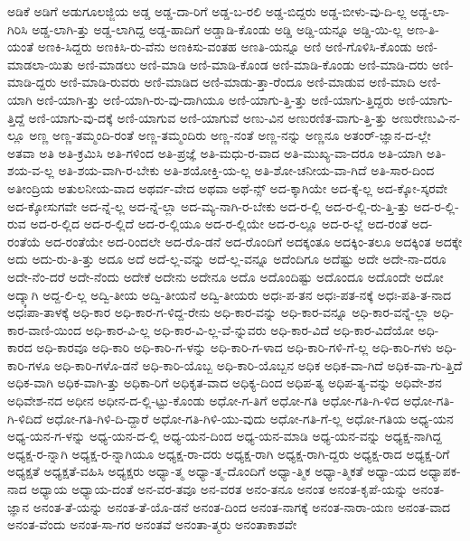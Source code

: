 {ಅಡಿಕೆ
ಅಡಿಗೆ
ಅಡುಗೂಲಜ್ಜಿಯ
ಅಡ್ಡ
ಅಡ್ಡ-ದಾ-ರಿಗೆ
ಅಡ್ಡ-ಬ-ರಲಿ
ಅಡ್ಡ-ಬಿದ್ದರು
ಅಡ್ಡ-ಬೀಳು-ವು-ದಿ-ಲ್ಲ
ಅಡ್ಡ-ಲಾ-ಗಿರಿಸಿ
ಅಡ್ಡ-ಲಾಗಿ-ತ್ತು
ಅಡ್ಡ-ಲಾಗಿದ್ದ
ಅಡ್ಡ-ಹಾದಿಗೆ
ಅಡ್ಡಾಡಿ-ಕೊಂಡು
ಅಡ್ಡಿ
ಅಡ್ಡಿ-ಯನ್ನೂ
ಅಡ್ಡಿ-ಯಿ-ಲ್ಲ
ಅಣ-ತಿ-ಯಂತೆ
ಅಣಕಿ-ಸಿದ್ದರು
ಅಣಕಿಸಿ-ರು-ವೆನು
ಅಣಕಿಸು-ವಂತಹ
ಅಣತಿ-ಯನ್ನೂ
ಅಣಿ
ಅಣಿ-ಗೊಳಿಸಿ-ಕೊಂಡು
ಅಣಿ-ಮಾಡಲಾ-ಯಿತು
ಅಣಿ-ಮಾಡಲು
ಅಣಿ-ಮಾಡಿ
ಅಣಿ-ಮಾಡಿ-ಕೊಂಡ
ಅಣಿ-ಮಾಡಿ-ಕೊಂಡು
ಅಣಿ-ಮಾಡಿ-ದರು
ಅಣಿ-ಮಾಡಿ-ದ್ದರು
ಅಣಿ-ಮಾಡಿ-ರುವರು
ಅಣಿ-ಮಾಡಿದ
ಅಣಿ-ಮಾಡು-ತ್ತಾ-ರೆಂದೂ
ಅಣಿ-ಮಾಡುವ
ಅಣಿ-ಮಾದಿ
ಅಣಿ-ಯಾಗಿ
ಅಣಿ-ಯಾಗಿ-ತ್ತು
ಅಣಿ-ಯಾಗಿ-ರು-ವು-ದಾಗಿಯೂ
ಅಣಿ-ಯಾಗು-ತ್ತಿ-ತ್ತು
ಅಣಿ-ಯಾಗು-ತ್ತಿದ್ದರು
ಅಣಿ-ಯಾಗು-ತ್ತಿದ್ದೆ
ಅಣಿ-ಯಾಗು-ವು-ದಕ್ಕೆ
ಅಣಿ-ಯಾಗುವ
ಅಣಿ-ಯಾಗುವೆ
ಅಣು-ವಿನ
ಅಣುರಣಿತ-ವಾಗು-ತ್ತಿ-ತ್ತು
ಅಣುರೇಣುವಿ-ನ-ಲ್ಲೂ
ಅಣ್ಣ
ಅಣ್ಣ-ತಮ್ಮಂದಿ-ರಂತೆ
ಅಣ್ಣ-ತಮ್ಮಂದಿರು
ಅಣ್ಣ-ನಂತೆ
ಅಣ್ಣ-ನನ್ನು
ಅಣ್ಣನೂ
ಅತಂರ್-ಜ್ಞಾನ-ದ-ಲ್ಲೇ
ಅತವಾ
ಅತಿ
ಅತಿ-ಕ್ರಮಿಸಿ
ಅತಿ-ಗಳಿಂದ
ಅತಿ-ಪ್ರಜ್ಞೆ
ಅತಿ-ಮಧು-ರ-ವಾದ
ಅತಿ-ಮುಖ್ಯ-ವಾ-ದರೂ
ಅತಿ-ಯಾಗಿ
ಅತಿ-ಶಯ-ವ-ಲ್ಲ
ಅತಿ-ಶಯ-ವಾಗಿ-ರ-ಬೇಕು
ಅತಿ-ಶಯೋಕ್ತಿ-ಯ-ಲ್ಲ
ಅತಿ-ಶೋ-ಚನೀಯ-ವಾ-ಗಿದೆ
ಅತಿ-ಸಾರ-ದಿಂದ
ಅತೀಂದ್ರಿಯ
ಅತುಲನೀಯ-ವಾದ
ಅಥರ್ವ-ವೇದ
ಅಥವಾ
ಅಥೆ-ನ್ಸ್
ಅದ-ಕ್ಕಾಗಿಯೇ
ಅದ-ಕ್ಕೆ-ಲ್ಲ
ಅದ-ಕ್ಕೋ-ಸ್ಕರವೇ
ಅದ-ಕ್ಕೋಸುಗವೇ
ಅದ-ನ್ನೆ-ಲ್ಲ
ಅದ-ನ್ನೆ-ಲ್ಲಾ
ಅದ-ಮ್ಯ-ನಾಗಿ-ರ-ಬೇಕು
ಅದ-ರ-ಲ್ಲಿ
ಅದ-ರ-ಲ್ಲಿ-ರು-ತ್ತಿ-ತ್ತು
ಅದ-ರ-ಲ್ಲಿ-ರುವ
ಅದ-ರ-ಲ್ಲಿದ
ಅದ-ರ-ಲ್ಲಿದೆ
ಅದ-ರ-ಲ್ಲಿಯೂ
ಅದ-ರ-ಲ್ಲಿಯೇ
ಅದ-ರ-ಲ್ಲೂ
ಅದ-ರ-ಲ್ಲೆ
ಅದ-ರಂತೆ
ಅದ-ರಂತೆಯೆ
ಅದ-ರಂತೆಯೇ
ಅದ-ರಿಂದಲೇ
ಅದ-ರೊ-ಡನೆ
ಅದ-ರೊಂದಿಗೆ
ಅದಕ್ಕಂತೂ
ಅದಕ್ಕಿಂ-ತಲೂ
ಅದಕ್ಕಿಂತ
ಅದಕ್ಕೇ
ಅದು
ಅದು-ರು-ತಿ-ತ್ತು
ಅದೂ
ಅದೆ
ಅದೆ-ಲ್ಲ-ವನ್ನು
ಅದೆ-ಲ್ಲ-ವನ್ನೂ
ಅದೆಂದಿಗೂ
ಅದೆಷ್ಟು
ಅದೇ
ಅದೇ-ನಾ-ದರೂ
ಅದೇ-ನೆಂ-ದರೆ
ಅದೇ-ನೆಂದು
ಅದೇಕೆ
ಅದೇನು
ಅದೇನೂ
ಅದೊ
ಅದೊಂದಿಷ್ಟು
ಅದೊಂದೂ
ಅದೊಂದೇ
ಅದೋ
ಅದ್ಕ್ಕಾಗಿ
ಅದ್ದ-ಲಿ-ಲ್ಲ
ಅದ್ವಿ-ತೀಯ
ಅದ್ವಿ-ತೀಯನೆ
ಅದ್ವಿ-ತೀಯರು
ಅಧಃ-ಪ-ತನ
ಅಧಃ-ಪತ-ನಕ್ಕೆ
ಅಧಃ-ಪತಿ-ತ-ನಾದ
ಅಧಃಪಾ-ತಾಳಕ್ಕೆ
ಅಧಿ-ಕಾರ
ಅಧಿ-ಕಾರ-ಗ-ಳಿದ್ದ-ರೇನು
ಅಧಿ-ಕಾರ-ವನ್ನು
ಅಧಿ-ಕಾರ-ವನ್ನೂ
ಅಧಿ-ಕಾರ-ವನ್ನೆ-ಲ್ಲಾ
ಅಧಿ-ಕಾರ-ವಾಣಿ-ಯಿಂದ
ಅಧಿ-ಕಾರ-ವಿ-ಲ್ಲ
ಅಧಿ-ಕಾರ-ವಿ-ಲ್ಲ-ವೆ-ನ್ನುವರು
ಅಧಿ-ಕಾರ-ವಿದೆ
ಅಧಿ-ಕಾರ-ವಿದೆಯೋ
ಅಧಿ-ಕಾರದ
ಅಧಿ-ಕಾರವೂ
ಅಧಿ-ಕಾರಿ
ಅಧಿ-ಕಾರಿ-ಗ-ಳನ್ನು
ಅಧಿ-ಕಾರಿ-ಗ-ಳಾದ
ಅಧಿ-ಕಾರಿ-ಗಳಿ-ಗೆ-ಲ್ಲ
ಅಧಿ-ಕಾರಿ-ಗಳು
ಅಧಿ-ಕಾರಿ-ಗಳೂ
ಅಧಿ-ಕಾರಿ-ಗಳೊ-ಡನೆ
ಅಧಿ-ಕಾರಿ-ಯೊಬ್ಬ
ಅಧಿ-ಕಾರಿ-ಯೊಬ್ಬನ
ಅಧಿಕ
ಅಧಿಕ-ವಾ-ಗಿದೆ
ಅಧಿಕ-ವಾ-ಗು-ತ್ತಿದೆ
ಅಧಿಕ-ವಾಗಿ
ಅಧಿಕ-ವಾಗಿ-ತ್ತು
ಅಧಿಕಾ-ರಿಗೆ
ಅಧಿಕೃತ-ವಾದ
ಅಧಿಕ್ಯ-ದಿಂದ
ಅಧಿಪ-ತ್ಯ
ಅಧಿಪ-ತ್ಯ-ವನ್ನು
ಅಧಿವೇ-ಶನ
ಅಧಿವೇಶ-ನದ
ಅಧೀನ
ಅಧೀನ-ದ-ಲ್ಲಿ-ಟ್ಟು-ಕೊಂಡು
ಅಧೋ-ಗ-ತಿಗೆ
ಅಧೋ-ಗತಿ
ಅಧೋ-ಗತಿ-ಗಿ-ಳಿದ
ಅಧೋ-ಗತಿ-ಗಿ-ಳಿದಿದೆ
ಅಧೋ-ಗತಿ-ಗಿಳಿ-ದಿ-ದ್ದಾರೆ
ಅಧೋ-ಗತಿ-ಗಿಳಿ-ಯು-ವುದು
ಅಧೋ-ಗತಿ-ಗೆ-ಲ್ಲ
ಅಧೋ-ಗತಿಯ
ಅಧ್ಯ-ಯನ
ಅಧ್ಯ-ಯನ-ಗ-ಳನ್ನು
ಅಧ್ಯ-ಯನ-ದ-ಲ್ಲಿ
ಅಧ್ಯ-ಯನ-ದಿಂದ
ಅಧ್ಯ-ಯನ-ಮಾಡಿ
ಅಧ್ಯ-ಯನ-ವನ್ನು
ಅಧ್ಯಕ್ಷ-ನಾಗಿದ್ದ
ಅಧ್ಯಕ್ಷ-ರ-ನ್ನಾಗಿ
ಅಧ್ಯಕ್ಷ-ರ-ನ್ನಾಗಿಯೂ
ಅಧ್ಯಕ್ಷ-ರಾ-ದರು
ಅಧ್ಯಕ್ಷ-ರಾಗಿ
ಅಧ್ಯಕ್ಷ-ರಾಗಿ-ದ್ದರು
ಅಧ್ಯಕ್ಷ-ರಾದ
ಅಧ್ಯಕ್ಷ-ರಿಗೆ
ಅಧ್ಯಕ್ಷತೆ
ಅಧ್ಯಕ್ಷತೆ-ವಹಿಸಿ
ಅಧ್ಯಕ್ಷರು
ಅಧ್ಯಾ-ತ್ಮ
ಅಧ್ಯಾ-ತ್ಮ-ದೊಂದಿಗೆ
ಅಧ್ಯಾ-ತ್ಮಿಕ
ಅಧ್ಯಾ-ತ್ಮಿಕತೆ
ಅಧ್ಯಾ-ಯದ
ಅಧ್ಯಾಪಕ-ನಾದ
ಅಧ್ಯಾಯ
ಅಧ್ಯಾಯ-ದಂತೆ
ಅನ-ವರ-ತವೂ
ಅನ-ವರತ
ಅನಂ-ತನೂ
ಅನಂತ
ಅನಂತ-ಕೃಪೆ-ಯನ್ನು
ಅನಂತ-ಜ್ಞಾನ
ಅನಂತ-ತೆ-ಯನ್ನು
ಅನಂತ-ತೆ-ಯೊ-ಡನೆ
ಅನಂತ-ದಿಂದ
ಅನಂತ-ನಾಗಕ್ಕೆ
ಅನಂತ-ನಾರಾ-ಯಣ
ಅನಂತ-ವಾದ
ಅನಂತ-ವೆಂದು
ಅನಂತ-ಸಾ-ಗರ
ಅನಂತವೆ
ಅನಂತಾ-ತ್ಮರು
ಅನಂತಾಕಾಶವೇ
}
